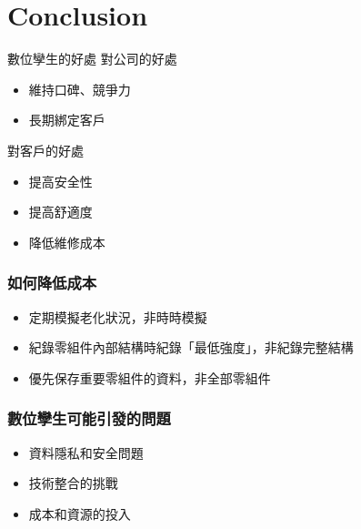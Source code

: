 \documentclass[xcolor=dvipsnames]{beamer}
\begin{document}
    \section{Conclusion}

    \begin{frame}{數位孿生的好處}
        對公司的好處
        \begin{itemize}
            \item 維持口碑、競爭力
            \item 長期綁定客戶
        \end{itemize}
        對客戶的好處
        \begin{itemize}
            \item 提高安全性
            \item 提高舒適度
            \item 降低維修成本
        \end{itemize}
    \end{frame}
    \begin{frame}
        \frametitle{如何降低成本}
        \begin{itemize}
            \item 定期模擬老化狀況，非時時模擬
            \item 紀錄零組件內部結構時紀錄「最低強度」，非紀錄完整結構
            \item 優先保存重要零組件的資料，非全部零組件
        \end{itemize}
    \end{frame}
    \begin{frame}
        \frametitle{數位孿生可能引發的問題}
        \begin{itemize}
            \item 資料隱私和安全問題
            \item 技術整合的挑戰
            \item 成本和資源的投入
        \end{itemize}
    \end{frame}
\end{document}
